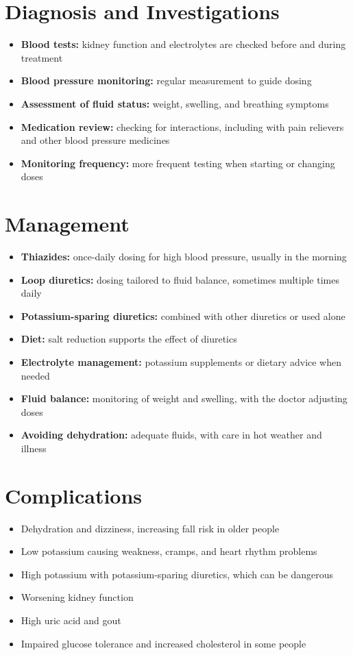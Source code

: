 \section*{Diagnosis and Investigations}
\begin{itemize}
    \item \textbf{Blood tests:} kidney function and electrolytes are checked before and during treatment
    \item \textbf{Blood pressure monitoring:} regular measurement to guide dosing
    \item \textbf{Assessment of fluid status:} weight, swelling, and breathing symptoms
    \item \textbf{Medication review:} checking for interactions, including with pain relievers and other blood pressure medicines
    \item \textbf{Monitoring frequency:} more frequent testing when starting or changing doses
\end{itemize}

\section*{Management}
\begin{itemize}
    \item \textbf{Thiazides:} once-daily dosing for high blood pressure, usually in the morning
    \item \textbf{Loop diuretics:} dosing tailored to fluid balance, sometimes multiple times daily
    \item \textbf{Potassium-sparing diuretics:} combined with other diuretics or used alone
    \item \textbf{Diet:} salt reduction supports the effect of diuretics
    \item \textbf{Electrolyte management:} potassium supplements or dietary advice when needed
    \item \textbf{Fluid balance:} monitoring of weight and swelling, with the doctor adjusting doses
    \item \textbf{Avoiding dehydration:} adequate fluids, with care in hot weather and illness
\end{itemize}

\section*{Complications}
\begin{itemize}
    \item Dehydration and dizziness, increasing fall risk in older people
    \item Low potassium causing weakness, cramps, and heart rhythm problems
    \item High potassium with potassium-sparing diuretics, which can be dangerous
    \item Worsening kidney function
    \item High uric acid and gout
    \item Impaired glucose tolerance and increased cholesterol in some people
\end{itemize}

